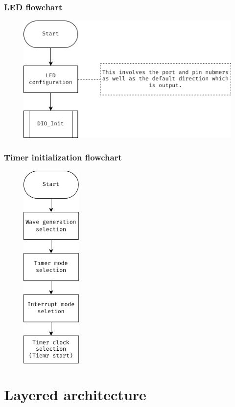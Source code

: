 \documentclass[10pt]{article}
\begin{document}
\subsubsection{LED flowchart}
\begin{figure}[H]
	\includegraphics[width=14cm]{led_init_flowchart}
	\centering
\end{figure}

\subsubsection{Timer initialization flowchart}
\begin{figure}[H]
	\includegraphics[width=3cm]{timer-init}
	\centering
\end{figure}

\section{Layered architecture}
\end{document}
